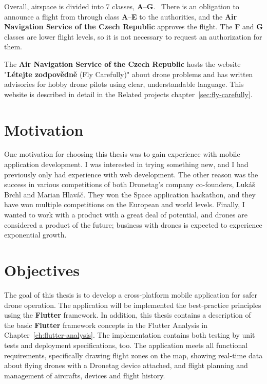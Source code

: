 Overall, airspace is divided into 7 classes, \textbf{A}--\textbf{G}.~\cite{airspace}
There is an obligation to announce a flight from through class \textbf{A}--\textbf{E} to the authorities, and the \textbf{Air Navigation Service of the Czech Republic} approves the flight.
The \textbf{F} and \textbf{G} classes are lower flight levels, so it is not necessary to request an authorization for them.

The \textbf{Air Navigation Service of the Czech Republic} hosts the website "\textbf{L{\' e}tejte zodpov{\v e}dn{\v e}} (Fly Carefully)" about drone problems and has written advisories for hobby drone pilots using clear, understandable language.
This website is described in detail in the Related projects chapter~\ref{sec:fly-carefully}.


\section{Motivation}\label{sec:motivation}
One motivation for choosing this thesis was to gain experience with mobile application development.
I was interested in trying something new, and I had previously only had experience with web development.
The other reason was the success in various competitions of both Dronetag's company co-founders, Luk{\' a}{\v s} Brchl and Marian Hlav{\' a}{\v c}.
They won the Space application hackathon, and they have won multiple competitions on the European and world levels.
Finally, I wanted to work with a product with a great deal of potential, and drones are considered a product of the future;
business with drones is expected to experience exponential growth.


\section{Objectives}\label{sec:objectives}
The goal of this thesis is to develop a cross-platform mobile application for safer drone operation.
The application will be implemented the best-practice principles using the \textbf{Flutter} framework.
In addition, this thesis contains a description of the basic \textbf{Flutter} framework concepts in the Flutter Analysis in Chapter~\ref{ch:flutter-analysis}.
The implementation contains both testing by unit tests and deployment specifications, too.
The application meets all functional requirements, specifically drawing flight zones on the map, showing real-time data about flying drones with a Dronetag device attached, and flight planning and management of aircrafts, devices and flight history.

